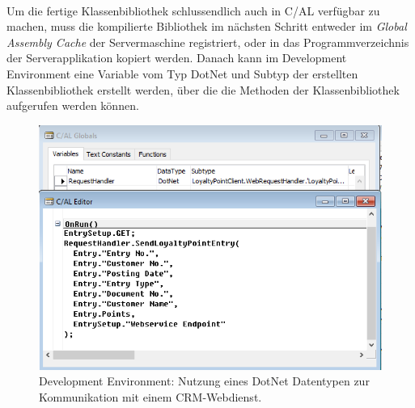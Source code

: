 \paragraph{}

Um die fertige Klassenbibliothek schlussendlich auch in C/AL verfügbar zu machen, muss die kompilierte Bibliothek im nächsten Schritt entweder im \textit{Global Assembly Cache}  der Servermaschine registriert, oder in das Programmverzeichnis der Serverapplikation kopiert werden. Danach kann im Development Environment eine Variable vom Typ DotNet und Subtyp der erstellten Klassenbibliothek erstellt werden, über die die Methoden der Klassenbibliothek aufgerufen werden können.

\begin{figure}[h]
	\centering
	\includegraphics[width=130mm]{images/dotnetVariable}
	\caption{Development Environment: Nutzung eines DotNet Datentypen zur Kommunikation mit einem CRM-Webdienst.}
	\label{fig:dotnetVariable}
\end{figure}



